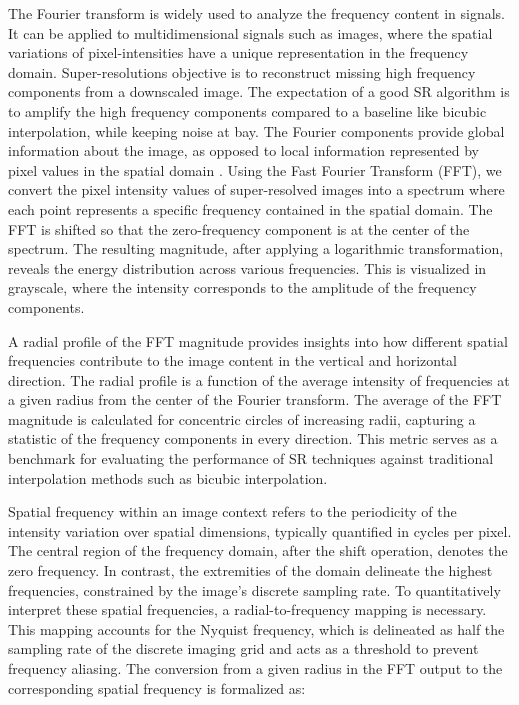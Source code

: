         The Fourier transform is widely used to analyze the frequency content in signals.
        It can be applied to multidimensional signals such as images, where the spatial variations of pixel-intensities have a unique representation in the frequency domain. 
        Super-resolutions objective is to reconstruct missing high frequency components from a downscaled image.
        The expectation of a good SR algorithm is to amplify the high frequency components compared to a baseline like bicubic interpolation, while keeping noise at bay.
        The Fourier components provide global information about the image, as opposed to local information represented by pixel values in the spatial domain \cite{fuoli2021fourier}. 
        Using the Fast Fourier Transform (FFT), we convert the pixel intensity values of super-resolved images into a spectrum where each point represents a specific frequency contained in the spatial domain.
        The FFT is shifted so that the zero-frequency component is at the center of the spectrum. 
        The resulting magnitude, after applying a logarithmic transformation, reveals the energy distribution across various frequencies.
        This is visualized in grayscale, where the intensity corresponds to the amplitude of the frequency components.
        
        A radial profile of the FFT magnitude provides insights into how different spatial frequencies contribute to the image content in the vertical and horizontal direction.
        The radial profile is a function of the average intensity of frequencies at a given radius from the center of the Fourier transform.
        The average of the FFT magnitude is calculated for concentric circles of increasing radii, capturing a statistic of the frequency components in every direction.
        This metric serves as a benchmark for evaluating the performance of SR techniques against traditional interpolation methods such as bicubic interpolation.
        
        Spatial frequency within an image context refers to the periodicity of the intensity variation over spatial dimensions, typically quantified in cycles per pixel. The central region of the frequency domain, after the shift operation, denotes the zero frequency. In contrast, the extremities of the domain delineate the highest frequencies, constrained by the image's discrete sampling rate.
        To quantitatively interpret these spatial frequencies, a radial-to-frequency mapping is necessary. This mapping accounts for the Nyquist frequency, which is delineated as half the sampling rate of the discrete imaging grid and acts as a threshold to prevent frequency aliasing.
        The conversion from a given radius in the FFT output to the corresponding spatial frequency is formalized as:

